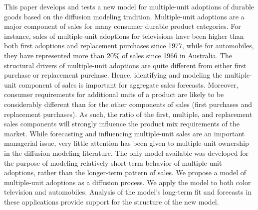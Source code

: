 This paper develops and tests a new model for multiple-unit adoptions of durable goods based on the diffusion modeling tradition. Multiple-unit adoptions are a major component of sales for many consumer durable product categories. For instance, sales of multiple-unit adoptions for televisions have been higher than both first adoptions and replacement purchases since 1977, while for automobiles, they have represented more than 20\% of sales since 1966 in Australia. The structural drivers of multiple-unit adoptions are quite different from either first purchase or replacement purchase. Hence, identifying and modeling the multiple-unit component of sales is important for aggregate sales forecasts. Moreover, consumer requirements for additional units of a product are likely to be considerably different than for the other components of sales (first purchases and replacement purchases). As such, the ratio of the first, multiple, and replacement sales components will strongly influence the product mix requirements of the market. While forecasting and influencing multiple-unit sales are an important managerial issue, very little attention has been given to multiple-unit ownership in the diffusion modeling literature. The only model available was developed for the purpose of modeling relatively short-term behavior of multiple-unit adoptions, rather than the longer-term pattern of sales. We propose a model of multiple-unit adoptions as a diffusion process. We apply the model to both color television and automobiles. Analysis of the model's long-term fit and forecasts in these applications provide support for the structure of the new model.
